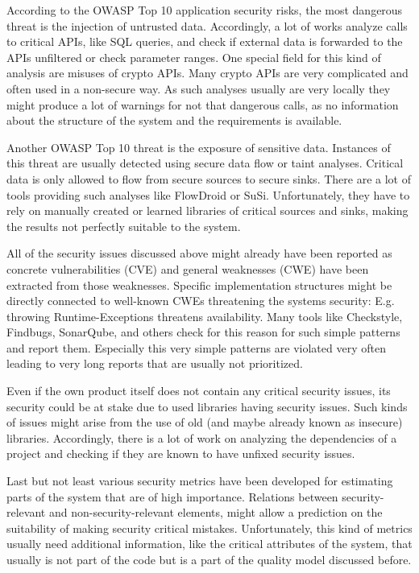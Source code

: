 According to the OWASP Top 10 application security risks, the most dangerous threat is the injection of untrusted data. Accordingly, a lot of works analyze calls to critical APIs, like SQL queries, and check if external data is forwarded to the APIs unfiltered or check parameter ranges. One special field for this kind of analysis are misuses of crypto APIs. Many crypto APIs are very complicated and often used in a non-secure way. As such analyses usually are very locally they might produce a lot of warnings for not that dangerous calls, as no information about the structure of the system and the requirements is available.

Another OWASP Top 10 threat is the exposure of sensitive data. Instances of this threat are usually detected using secure data flow or taint analyses. Critical data is only allowed to flow from secure sources to secure sinks. There are a lot of tools providing such analyses like FlowDroid or SuSi. Unfortunately, they have to rely on manually created or learned libraries of critical sources and sinks, making the results not perfectly suitable to the system.

All of the security issues discussed above might already have been reported as concrete vulnerabilities (CVE) and general weaknesses (CWE) have been extracted from those weaknesses. Specific implementation structures might be directly connected to well-known CWEs threatening the systems security: E.g. throwing Runtime-Exceptions threatens availability. Many tools like Checkstyle, Findbugs, SonarQube, and others check for this reason for such simple patterns and report them. Especially this very simple patterns are violated very often leading to very long reports that are usually not prioritized.

Even if the own product itself does not contain any critical security issues, its security could be at stake due to used libraries having security issues. Such kinds of issues might arise from the use of old (and maybe already known as insecure) libraries. Accordingly, there is a lot of work on analyzing the dependencies of a project and checking if they are known to have unfixed security issues.

Last but not least various security metrics have been developed for estimating parts of the system that are of high importance. Relations between security-relevant and non-security-relevant elements, might allow a prediction on the suitability of making security critical mistakes. Unfortunately, this kind of metrics usually need additional information, like the critical attributes of the system, that usually is not part of the code but is a part of the quality model discussed before.

